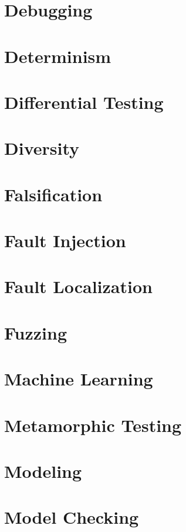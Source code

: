 \chapter{Debugging}

\chapter{Determinism}

\chapter{Differential Testing}

\chapter{Diversity}

\chapter{Falsification}

\chapter{Fault Injection}

\chapter{Fault Localization}

\chapter{Fuzzing}

\chapter{Machine Learning}

\chapter{Metamorphic Testing}

\chapter{Modeling}

\chapter{Model Checking}

